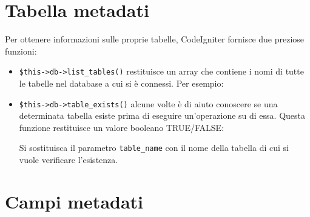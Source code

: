 \section*{Tabella metadati}
Per ottenere informazioni sulle proprie tabelle, CodeIgniter fornisce due preziose funzioni:

\begin{itemize}
\item \verb|$this->db->list_tables()| restituisce un array che contiene i nomi di tutte le tabelle nel database a cui si è connessi. Per esempio:


\item \verb|$this->db->table_exists()| alcune volte è di aiuto conoscere se una determinata tabella esiste prima di eseguire un'operazione su di essa. Questa funzione restituisce un valore booleano TRUE/FALSE:


Si sostituisca il parametro \verb|table_name| con il nome della tabella di cui si vuole verificare l'esistenza.
\end{itemize}


\section*{Campi metadati}

